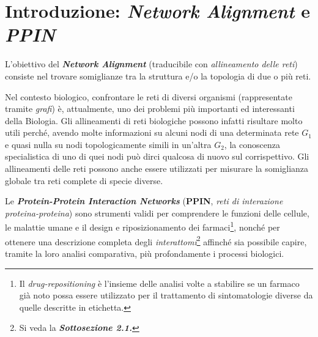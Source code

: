 \documentclass[11pt]{article}
\begin{document}
\setcounter{page}{1}
\newpage
\tableofcontents %
\thispagestyle{empty}
\clearpage

\newpage
\section{Introduzione: \textit{Network Alignment} e \textit{PPIN}}
L'obiettivo del \textit{\textbf{Network Alignment}} (traducibile con \textit{allineamento delle reti}) consiste nel trovare somiglianze tra la struttura e/o la topologia di due o più reti. 

Nel contesto biologico, confrontare le reti di diversi organismi (rappresentate tramite \textit{grafi}) è, attualmente, uno dei problemi più importanti ed interessanti della Biologia. Gli allineamenti di reti biologiche possono infatti risultare molto utili perché, avendo molte informazioni su alcuni nodi di una determinata rete $G_1$ e quasi nulla su nodi topologicamente simili in un'altra $G_2$, la conoscenza specialistica di uno di quei nodi può dirci qualcosa di nuovo sul corrispettivo. Gli allineamenti delle reti possono anche essere utilizzati per misurare la somiglianza globale tra reti complete di specie diverse. 

Le \textit{\textbf{Protein-Protein Interaction Networks}} (\textbf{PPIN}, \textit{reti di interazione proteina-proteina}) sono strumenti validi per comprendere le funzioni delle cellule, le malattie umane e il design e riposizionamento dei farmaci\footnote{Il \textit{drug-repositioning} è l’insieme delle analisi volte a stabilire se un farmaco già noto possa essere utilizzato per il trattamento di sintomatologie diverse da quelle descritte in etichetta.}, nonché per ottenere una descrizione completa degli \textit{interattomi}\footnote{Si veda la \textit{\textbf{Sottosezione 2.1.}}} affinché sia possibile capire, tramite la loro analisi comparativa, più profondamente i processi biologici.
\end{document}

